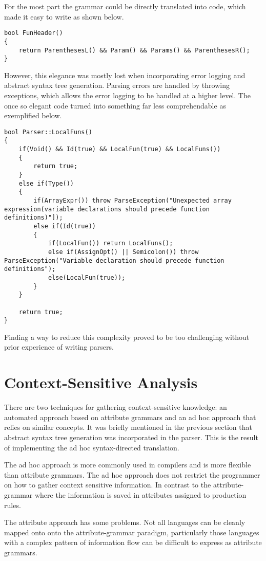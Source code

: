 \documentclass[12pt]{article}
\begin{document}
For the most part the grammar could be directly translated into code, which made it easy to write as shown below.
\begin{lstlisting}
bool FunHeader()
{
	return ParenthesesL() && Param() && Params() && ParenthesesR();
}
\end{lstlisting}
However, this elegance was mostly lost when incorporating error logging and abstract syntax tree generation. Parsing errors are handled by throwing exceptions, which allows the error logging to be handled at a higher level. The once so elegant code turned into something far less comprehendable as exemplified below.
\begin{lstlisting}
bool Parser::LocalFuns()
{
	if(Void() && Id(true) && LocalFun(true) && LocalFuns())
	{
		return true;
	}
	else if(Type())
	{
		if(ArrayExpr()) throw ParseException("Unexpected array expression(variable declarations should precede function definitions)"]);
		else if(Id(true))
		{
			if(LocalFun()) return LocalFuns();
			else if(AssignOpt() || Semicolon()) throw ParseException("Variable declaration should precede function definitions");
			else(LocalFun(true));
		}
	}

	return true;
}
\end{lstlisting}

Finding a way to reduce this complexity proved to be too challenging without prior experience of writing parsers.

\section{Context-Sensitive Analysis}

There are two techniques for gathering context-sensitive knowledge: an automated approach based on attribute grammars \cite{paakki1995attribute} and an ad hoc approach that relies on similar concepts. It was briefly mentioned in the previous section that abstract syntax tree generation was incorporated in the parser. This is the result of implementing the ad hoc syntax-directed translation.

The ad hoc approach is more commonly used in compilers and is more flexible than attribute grammars. The ad hoc approach does not restrict the programmer on how to gather context sensitive information. In contrast to the attribute-grammar where the information is saved in attributes assigned to production rules.

The attribute approach has some problems. Not all languages can be cleanly mapped onto onto the attribute-grammar paradigm, particularly those languages with a complex pattern of information flow can be difficult to express as attribute grammars.
\end{document}
